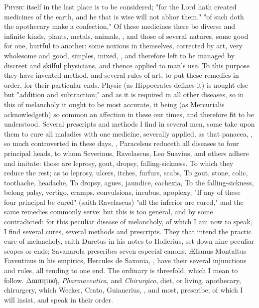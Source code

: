 {\lettrine{P}{hysic} itself in the last place is to be considered; "for the Lord hath created medicines of the earth, and he that is wise will not abhor them."   "of such doth the apothecary make a confection," \etc{} Of these medicines there be diverse and infinite kinds, plants, metals, animals, \etc{}, and those of several natures, some good for one, hurtful to another: some noxious in themselves, corrected by art, very wholesome and good, simples, mixed, \etc{}, and therefore left to be managed by discreet and skilful physicians, and thence applied to man's use. To this purpose they have invented method, and several rules of art, to put these remedies in order, for their particular ends. Physic (as Hippocrates defines it) is nought else but "addition and subtraction;" and as it is required in all other diseases, so in this of melancholy it ought to be most accurate, it being (as Mercurialis acknowledgeth) so common an affection in these our times, and therefore fit to be understood. Several prescripts and methods I find in several men, some take upon them to cure all maladies with one medicine, severally applied, as that panacea, , so much controverted in these days, , \etc{} Paracelsus reduceth all diseases to four principal heads, to whom Severinus, Ravelascus, Leo Suavius, and others adhere and imitate: those are leprosy, gout, dropsy, falling-sickness. To which they reduce the rest; as to leprosy, ulcers, itches, furfurs, scabs, \etc{} To gout, stone, colic, toothache, headache, \etc{} To dropsy, agues, jaundice, cachexia, \etc{} To the falling-sickness, belong palsy, vertigo, cramps, convulsions, incubus, apoplexy, \etc{} "If any of these four principal be cured" (saith Ravelascus) "all the inferior are cured," and the same remedies commonly serve: but this is too general, and by some contradicted: for this peculiar disease of melancholy, of which I am now to speak, I find several cures, several methods and prescripts. They that intend the practic cure of melancholy, saith Duretus in his notes to Hollerius, set down nine peculiar scopes or ends; Savanarola prescribes seven especial canons. \AE{}lianus Montaltus  Faventinus in his empirics, Hercules de Saxonia, \etc{}, have their several injunctions and rules, all tending to one end. The ordinary is threefold, which I mean to follow. \textgreek[variant=ancient]{Διαιτητικὴ}, \emph{Pharmaceutica}, and \emph{Chirurgica}, diet, or living, apothecary, chirurgery, which Wecker, Crato, Guianerius, \etc{}, and most, prescribe; of which I will insist, and speak in their order.


}
